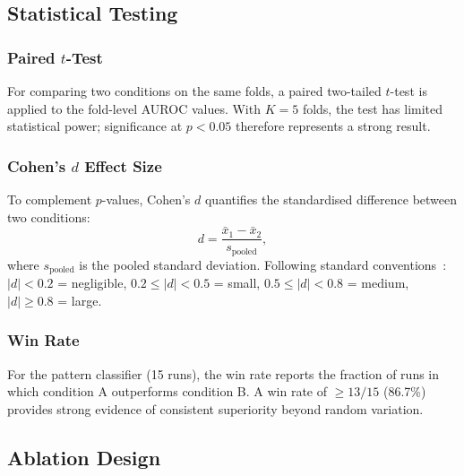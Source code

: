\subsection{Statistical Testing}
\label{sec:meth:eval:testing}

\subsubsection{Paired $t$-Test}

For comparing two conditions on the same folds, a paired two-tailed $t$-test is applied to the fold-level AUROC values.
With $K = 5$ folds, the test has limited statistical power; significance at $p < 0.05$ therefore represents a strong result.

\subsubsection{Cohen's $d$ Effect Size}

To complement $p$-values, Cohen's $d$ quantifies the standardised difference between two conditions:
\begin{equation}
\label{eq:cohens_d}
d = \frac{\bar{x}_1 - \bar{x}_2}{s_{\text{pooled}}},
\end{equation}
where $s_{\text{pooled}}$ is the pooled standard deviation.
Following standard conventions~\cite{cohen1988statistical}: $|d| < 0.2$ = negligible, $0.2 \leq |d| < 0.5$ = small, $0.5 \leq |d| < 0.8$ = medium, $|d| \geq 0.8$ = large.

\subsubsection{Win Rate}

For the pattern classifier (15 runs), the win rate reports the fraction of runs in which condition A outperforms condition B.
A win rate of $\geq 13/15$ (86.7\%) provides strong evidence of consistent superiority beyond random variation.

\subsection{Ablation Design}
\label{sec:meth:eval:ablation}

